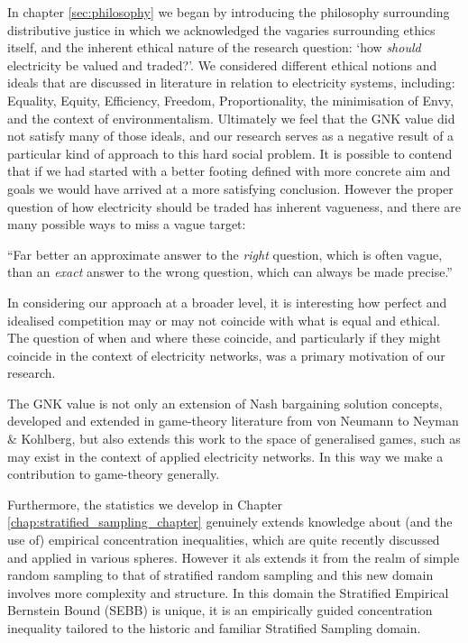 In chapter \ref{sec:philosophy} we began by introducing the philosophy surrounding distributive justice in which we acknowledged the vagaries surrounding ethics itself, and the inherent ethical nature of the research question: `how \textit{should} electricity be valued and traded?'.
We considered different ethical notions and ideals that are discussed in literature in relation to electricity systems, including: Equality, Equity, Efficiency, Freedom, Proportionality, the minimisation of Envy, and the context of environmentalism.
Ultimately we feel that the GNK value did not satisfy many of those ideals, and our research serves as a negative result of a particular kind of approach to this hard social problem.
It is possible to contend that if we had started with a better footing defined with more concrete aim and goals we would have arrived at a more satisfying conclusion.
However the proper question of how electricity should be traded has inherent vagueness, and there are many possible ways to miss a vague target:

\begin{displayquote}
``Far better an approximate answer to the \textit{right} question, which is often vague, than an \textit{exact} answer to the wrong question, which can always be made precise.'' \cite{10.2307/2237638}
\end{displayquote}

In considering our approach at a broader level, it is interesting how perfect and idealised competition may or may not coincide with what is equal and ethical.
The question of when and where these coincide, and particularly if they might coincide in the context of electricity networks, was a primary motivation of our research.

The GNK value is not only an extension of Nash bargaining solution concepts, developed and extended in game-theory literature from von Neumann to Neyman \& Kohlberg, but also extends this work to the space of generalised games, such as may exist in the context of applied electricity networks.
In this way we make a contribution to game-theory generally.

Furthermore, the statistics we develop in Chapter \ref{chap:stratified_sampling_chapter} genuinely extends knowledge about (and the use of) empirical concentration inequalities, which are quite recently discussed and applied in various spheres. However it als extends it from the realm of simple random sampling to that of stratified random sampling and this new domain involves more complexity and structure.
In this domain the Stratified Empirical Bernstein Bound (SEBB) is unique, it is an empirically guided concentration inequality tailored to the historic and familiar Stratified Sampling domain.

